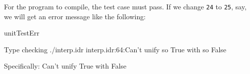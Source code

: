 \noindent
For the program to compile, the test case must pass. If we change \texttt{24} to \texttt{25},
say, we will get an error message like the following:

\begin{SaveVerbatim}{unitTestErr}

Type checking ./interp.idr
interp.idr:64:Can't unify so True with so False

Specifically:
	 Can't unify True with False

\end{SaveVerbatim}


